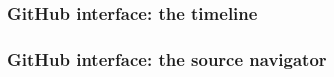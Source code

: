 \documentclass[8pt]{beamer}
\begin{document}
\begin{frame}
  \frametitle{GitHub interface: the timeline}
  \centering {}
\end{frame}
\begin{frame}
  \frametitle{GitHub interface: the source navigator}
  \centering {}
\end{frame}
\end{document}
